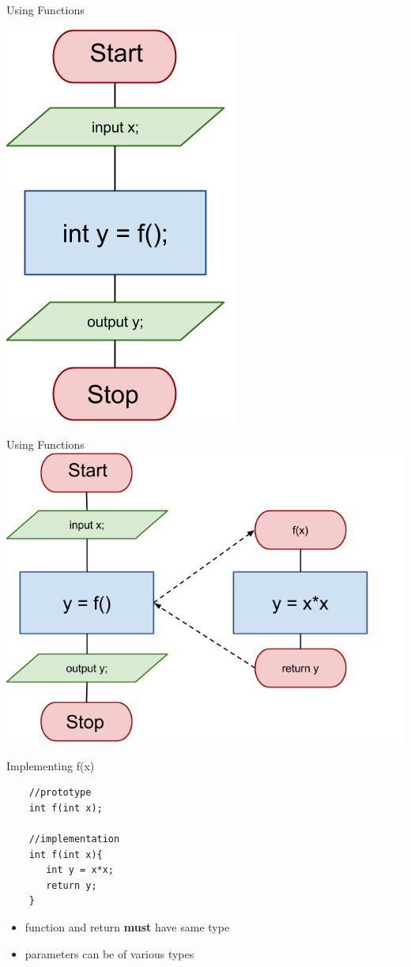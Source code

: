 \documentclass[xcolor={dvipsnames}]{beamer}
\begin{document}
\begin{frame}{Using Functions}
	\begin{center}
	\includegraphics[width=.4\textwidth]{fsq}
	\end{center}
\end{frame}

\begin{frame}{Using Functions}
	\includegraphics[width=1\textwidth]{fsq_function}
\end{frame}

\begin{frame}[fragile]{Implementing f(x)}
	\begin{center}
	 
	\begin{verbatim}
	//prototype
	int f(int x);

	//implementation
	int f(int x){
	   int y = x*x;
	   return y;
	}   
	\end{verbatim}
	\end{center}
	\begin{center}
		\begin{itemize}
			\item function and return \textbf{must} have same type
			\item parameters can be of various types
		\end{itemize}
	\end{center}
\end{frame}
\end{document}
